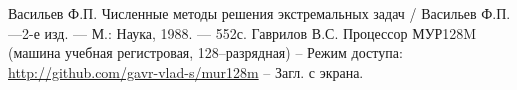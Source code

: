 \documentclass[14pt]{report}
\begin{document}
\renewcommand{\bibname}{Список литературы}
\begin{thebibliography}{99}
	 Васильев Ф.П. Численные методы решения экстремальных задач / Васильев Ф.П. ---2-е изд. --- М.: Наука, 1988. --- 552с.
	 Гаврилов В.С. Процессор МУР128M (машина учебная регистровая, 128--разрядная) -- Режим доступа: \url{http://github.com/gavr-vlad-s/mur128m} -- Загл. с экрана.
\end{thebibliography}  
\end{document}

